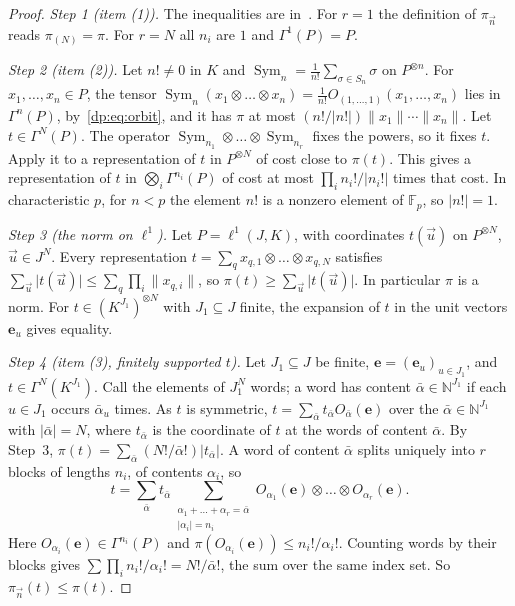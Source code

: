 \documentclass[11pt]{amsart}
\theoremstyle{definition}
\theoremstyle{remark}
\numberwithin{equation}{section}
\newcommand{\N}{\mathbb N}
\newcommand{\F}{\mathbb F}
\newcommand{\abs}[1]{\lvert #1\rvert}
\newcommand{\norm}[1]{\lVert #1\rVert}
\theoremstyle{plain}
\theoremstyle{definition}
\theoremstyle{plain}
\begin{document}
\begin{proof}
\emph{Step 1 (item (1)).} The inequalities are in~\cite[Definition~14.21]{I}. For $r=1$ the definition of $\pi_{\vec n}$ reads $\pi_{(N)}=\pi$. For $r=N$ all $n_i$ are $1$ and $\Gamma^1(P)=P$.

\emph{Step 2 (item (2)).} Let $n!\ne0$ in $K$ and $\operatorname{Sym}_n=\frac1{n!}\sum_{\sigma\in S_n}\sigma$ on $P^{\otimes n}$. For $x_1,\dots,x_n\in P$, the tensor $\operatorname{Sym}_n(x_1\otimes\dots\otimes x_n)=\frac1{n!}O_{(1,\dots,1)}(x_1,\dots,x_n)$ lies in $\Gamma^n(P)$, by~\eqref{dp:eq:orbit}, and it has $\pi$ at most $(n!/\abs{n!})\norm{x_1}\cdots\norm{x_n}$. Let $t\in\Gamma^N(P)$. The operator $\operatorname{Sym}_{n_1}\otimes\dots\otimes\operatorname{Sym}_{n_r}$ fixes the powers, so it fixes $t$. Apply it to a representation of $t$ in $P^{\otimes N}$ of cost close to $\pi(t)$. This gives a representation of $t$ in $\bigotimes_i\Gamma^{n_i}(P)$ of cost at most $\prod_in_i!/\abs{n_i!}$ times that cost. In characteristic $p$, for $n<p$ the element $n!$ is a nonzero element of $\F_p$, so $\abs{n!}=1$.

\emph{Step 3 (the norm on $\ell^1$).} Let $P=\ell^1(J,K)$, with coordinates $t(\vec u)$ on $P^{\otimes N}$, $\vec u\in J^N$. Every representation $t=\sum_qx_{q,1}\otimes\dots\otimes x_{q,N}$ satisfies $\sum_{\vec u}\abs{t(\vec u)}\le\sum_q\prod_i\norm{x_{q,i}}$, so $\pi(t)\ge\sum_{\vec u}\abs{t(\vec u)}$. In particular $\pi$ is a norm. For $t\in(K^{J_1})^{\otimes N}$ with $J_1\subseteq J$ finite, the expansion of $t$ in the unit vectors $\mathbf e_u$ gives equality.

\emph{Step 4 (item (3), finitely supported $t$).} Let $J_1\subseteq J$ be finite, $\mathbf e=(\mathbf e_u)_{u\in J_1}$, and $t\in\Gamma^N(K^{J_1})$. Call the elements of $J_1^N$ words; a word has content $\bar\alpha\in\N^{J_1}$ if each $u\in J_1$ occurs $\bar\alpha_u$ times. As $t$ is symmetric, $t=\sum_{\bar\alpha}t_{\bar\alpha}O_{\bar\alpha}(\mathbf e)$ over the $\bar\alpha\in\N^{J_1}$ with $\abs{\bar\alpha}=N$, where $t_{\bar\alpha}$ is the coordinate of $t$ at the words of content $\bar\alpha$. By Step~3, $\pi(t)=\sum_{\bar\alpha}(N!/\bar\alpha!)\abs{t_{\bar\alpha}}$. A word of content $\bar\alpha$ splits uniquely into $r$ blocks of lengths $n_i$, of contents $\alpha_i$, so
\[
 t=\sum_{\bar\alpha}t_{\bar\alpha}\sum_{\substack{\alpha_1+\dots+\alpha_r=\bar\alpha\\\abs{\alpha_i}=n_i}}O_{\alpha_1}(\mathbf e)\otimes\dots\otimes O_{\alpha_r}(\mathbf e).
\]
Here $O_{\alpha_i}(\mathbf e)\in\Gamma^{n_i}(P)$ and $\pi(O_{\alpha_i}(\mathbf e))\le n_i!/\alpha_i!$. Counting words by their blocks gives $\sum\prod_in_i!/\alpha_i!=N!/\bar\alpha!$, the sum over the same index set. So $\pi_{\vec n}(t)\le\pi(t)$.


\end{proof}
\end{document}

